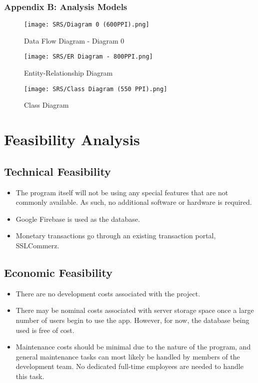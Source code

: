 \documentclass{scrreprt}
\begin{document}
        \subsection{Appendix B: Analysis Models}
        
            \begin{figure}[H]
                \centering                \texttt{[image: SRS/Diagram 0 (600PPI).png]}
                {\caption*{Data Flow Diagram - Diagram 0}}
            \end{figure}

            \begin{figure}[H]
                \centering
                \texttt{[image: SRS/ER Diagram - 800PPI.png]}
                {\caption*{Entity-Relationship Diagram}}
            \end{figure}

            \begin{figure}[H]
                \centering                \texttt{[image: SRS/Class Diagram (550 PPI).png]}
                {\caption*{Class Diagram}}
            \end{figure}


\chapter{Feasibility Analysis}

    \section{Technical Feasibility}
        \begin{itemize}
            \item The program itself will not be using any special features that are not commonly available. As such, no additional software or hardware is required.
            \item Google Firebase is used as the database.
            \item Monetary transactions go through an existing transaction portal, SSLCommerz.
        \end{itemize}
    
    \section{Economic Feasibility}
        \begin{itemize}
            \item There are no development costs associated with the project.
            \item There may be nominal costs associated with server storage space once a large number of users begin to use the app. However, for now, the database being used is free of cost.
            \item Maintenance costs should be minimal due to the nature of the program, and general maintenance tasks can most likely be handled by members of the development team. No dedicated full-time employees are needed to handle this task.
        \end{itemize}
    
\end{document}
